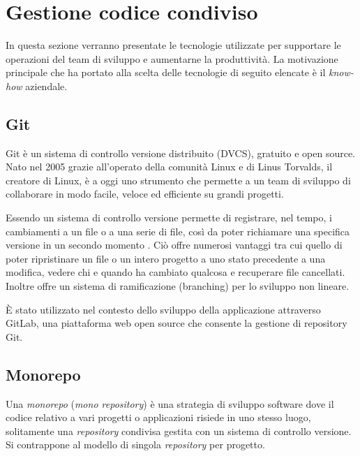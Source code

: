 \section{Gestione codice condiviso}
In questa sezione verranno presentate le tecnologie utilizzate per supportare le operazioni
del team di sviluppo e aumentarne la produttività.
La motivazione principale che ha portato alla scelta delle tecnologie di seguito elencate è il \textit{know-how} aziendale.

\subsection{Git}
Git \cite{Git} è un sistema di controllo versione distribuito (DVCS), gratuito e open source.
Nato nel 2005 grazie all'operato della comunità Linux e di Linus Torvalds, il creatore di Linux, è a oggi uno strumento che
permette a un team di sviluppo di collaborare in modo facile, veloce ed efficiente su grandi progetti.

Essendo un sistema di controllo versione permette di registrare, nel tempo, i cambiamenti a un file o a una serie di file,
così da poter richiamare una specifica versione in un secondo momento \cite{GitPro}.
Ciò offre numerosi vantaggi tra cui quello di poter ripristinare un file o un intero progetto a uno stato precedente a una modifica,
vedere chi e quando ha cambiato qualcosa e recuperare file cancellati.
Inoltre offre un sistema di ramificazione (branching) per lo sviluppo non lineare.

È stato utilizzato nel contesto dello sviluppo della applicazione attraverso GitLab, una piattaforma web open source che consente
la gestione di repository Git.

\subsection{Monorepo}
Una \textit{monorepo}\cite{Google-Monorepo} (\textit{mono repository}) è una strategia di sviluppo software dove il codice
relativo a vari progetti o applicazioni risiede in uno stesso luogo, solitamente una \textit{repository} condivisa
gestita con un sistema di controllo versione.
Si contrappone al modello di singola \textit{repository} per progetto.

